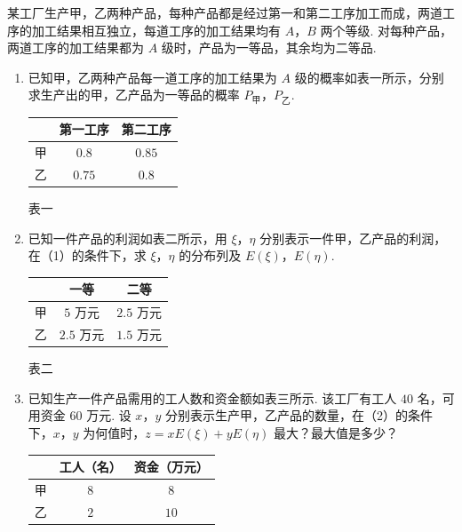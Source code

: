 \begin{problem}
某工厂生产甲，乙两种产品，每种产品都是经过第一和第二工序加工而成，两道工序的加工结果相互独立，每道工序的加工结果均有 \(A\)，\(B\) 两个等级. 对每种产品，两道工序的加工结果都为 \(A\) 级时，产品为一等品，其余均为二等品.

\begin{enumerate}
\item 已知甲，乙两种产品每一道工序的加工结果为 \(A\) 级的概率如表一所示，分别求生产出的甲，乙产品为一等品的概率 \(P_{\text{甲}}\)，\(P_{\text{乙}}\).

\begin{center}
\begin{tabular}{c|cc}
\hline
 & 第一工序 & 第二工序 \\
\hline
甲 & \(0.8\) & \(0.85\) \\
乙 & \(0.75\) & \(0.8\) \\
\hline
\end{tabular}

表一
\end{center}

\item 已知一件产品的利润如表二所示，用 \(\xi\)，\(\eta\) 分别表示一件甲，乙产品的利润，在（1）的条件下，求 \(\xi\)，\(\eta\) 的分布列及 \(E(\xi)\)，\(E(\eta)\).

\begin{center}
\begin{tabular}{c|cc}
\hline
 & 一等 & 二等 \\
\hline
甲 & \(5\text{ 万元}\) & \(2.5\text{ 万元}\) \\
乙 & \(2.5\text{ 万元}\) & \(1.5\text{ 万元}\) \\
\hline
\end{tabular}

表二
\end{center}

\item 已知生产一件产品需用的工人数和资金额如表三所示. 该工厂有工人 \(40\) 名，可用资金 \(60\) 万元. 设 \(x\)，\(y\) 分别表示生产甲，乙产品的数量，在（2）的条件下，\(x\)，\(y\) 为何值时，\(z = xE(\xi) + yE(\eta)\) 最大？最大值是多少？

\begin{center}
\begin{tabular}{c|cc}
\hline
 & 工人（名） & 资金（万元） \\
\hline
甲 & \(8\) & \(8\) \\
乙 & \(2\) & \(10\) \\
\hline
\end{tabular}


\end{center}
\end{enumerate}
\end{problem}
